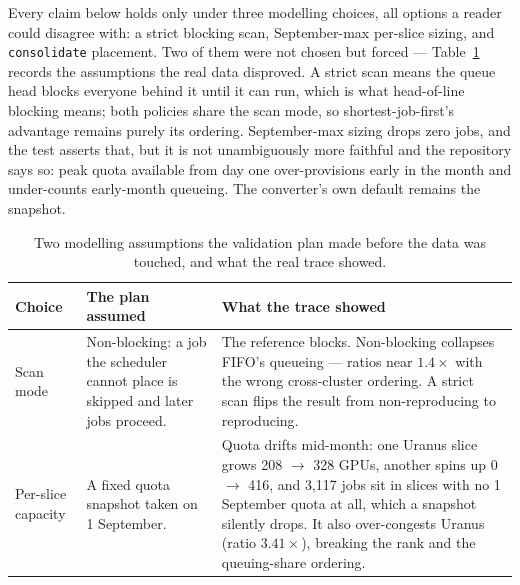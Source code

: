Every claim below holds only under three modelling choices, all options a reader
could disagree with: a strict blocking scan, September-max per-slice sizing, and
\texttt{consolidate} placement. Two of them were not chosen but forced ---
Table~\ref{tab:corrections} records the assumptions the real data disproved. A
strict scan means the queue head blocks everyone behind it until it can run,
which is what head-of-line blocking means; both policies share the scan mode, so
shortest-job-first's advantage remains purely its ordering. September-max sizing
drops zero jobs, and the test asserts that, but it is not unambiguously more
faithful and the repository says so: peak quota available from day one
over-provisions early in the month and under-counts early-month queueing. The
converter's own default remains the snapshot.

\begin{table}[t]
\centering\small
\caption{Two modelling assumptions the validation plan made before the data was
touched, and what the real trace showed.}
\label{tab:corrections}
\begin{tabular}{p{}p{}p{}}
\toprule
Choice & The plan assumed & What the trace showed \\
\midrule
Scan mode &
Non-blocking: a job the scheduler cannot place is skipped and later jobs
proceed. &
The reference blocks. Non-blocking collapses FIFO's queueing --- ratios near
$1.4\times$ with the wrong cross-cluster ordering. A strict scan flips the
result from non-reproducing to reproducing. \\
Per-slice capacity &
A fixed quota snapshot taken on 1 September. &
Quota drifts mid-month: one Uranus slice grows 208 $\to$ 328 GPUs, another
spins up 0 $\to$ 416, and 3{,}117 jobs sit in slices with no 1 September quota
at all, which a snapshot silently drops. It also over-congests Uranus (ratio
$3.41\times$), breaking the rank and the queuing-share ordering. \\
\bottomrule
\end{tabular}
\end{table}

